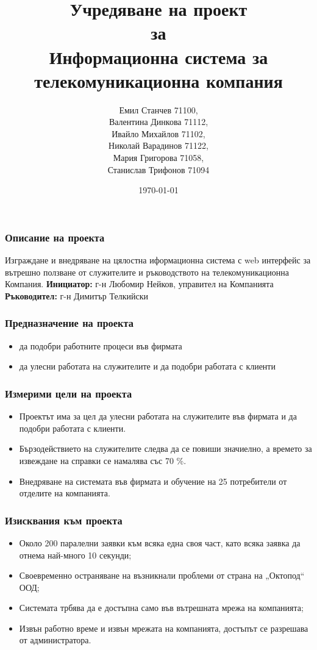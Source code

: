 \documentclass{beamer}
\title[Учредяване на проект за Информационна система за телекомуникационна компания]{Учредяване на проект \\ за \\ Информационна система за телекомуникационна компания}
\author{Емил Станчев 71100,\\
Валентина Динкова 71112,\\
Ивайло Михайлов 71102,\\
Николай Варадинов 71122,\\
Мария Григорова 71058,\\
Станислав Трифонов 71094}
\institute{ФМИ}
\date{\today}
\begin{document}
\begin{frame}
  \titlepage
\end{frame}

\begin{frame}
  \frametitle{Описание на проекта}
Изграждане и внедряване на цялостна иформационна система с web интерфейс за вътрешно ползване 
от служителите и ръководството на телекомуникационна Компания. 
\newline
\newline
\textbf{Инициатор:} г-н Любомир Нейков, управител на Компанията
\textbf{Ръководител:} г-н Димитър Телкийски
\end{frame}

\begin{frame}
  \frametitle{Предназначение на проекта}
  \begin{itemize}
      \item да подобри работните процеси във фирмата
      \item да улесни работата на служителите и да подобри работата с клиенти
  \end{itemize}
\end{frame}

\begin{frame}
  \frametitle{Измерими цели на проекта}
  \begin{itemize}
    \item Проектът има за цел да улесни работата на служителите във фирмата и да подобри работата с клиенти. 
    \item Бързодействието на служителите следва да се повиши значиелно, а времето за извеждане на справки се 
        намалява със 70 \%.
    \item Внедряване на системата във фирмата и обучение на 25 потребители от отделите на компанията.
  \end{itemize}
\newline
\newline
\end{frame}

\begin{frame}
  \frametitle{Изисквания към проекта}
  \begin{itemize}
      \item Около 200 паралелни заявки към всяка една своя част, като всяка заявка да отнема най-много 10 секунди;
      \item Своевременно остраняване на възникнали проблеми от страна на „Октопод“ ООД;
      \item Системата трбява да е достъпна само във вътрешната мрежа на компанията;
      \item Извън работно време и извън мрежата на компанията, достъпът се разрешава от администратора.
  \end{itemize}
\end{frame}
\end{document}
